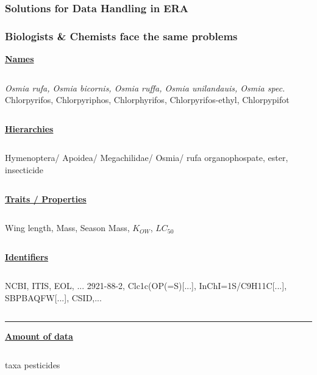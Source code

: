 \documentclass[
	10pt
	]{beamer}
\begin{document}
\begin{frame}[noframenumbering]
\frametitle{Solutions for Data Handling in ERA}
 \resizebox{11.5cm}{!}{%
				
				}
\end{frame}

{
\begin{frame}
\frametitle{Biologists \& Chemists face the same problems}
	\small
	\centering
	\pause
	\textbf{\alert{\underline{Names}}}
	\begin{columns}[t]
	\emph{Osmia rufa, Osmia bicornis, Osmia ruffa, Osmia unilandauis, Osmia spec.} 
	Chlorpyrifos, Chlorpyriphos, Chlorphyrifos, Chlorpyrifos-ethyl, Chlorpypifot
	\end{columns}
	\pause

	\centering
	\textbf{\alert{\underline{Hierarchies}}}
	\begin{columns}[t]
	Hymenoptera/ Apoidea/ Megachilidae/ Osmia/ rufa 
	organophospate, ester, insecticide
	\end{columns}
	\pause

	\centering
	\textbf{\alert{\underline{Traits / Properties}}}
	\begin{columns}[t]
	Wing length, Mass, Season 
	Mass, $K_{OW}$, $LC_{50}$
	\end{columns}
	\pause

	\centering
	\textbf{\alert{\underline{Identifiers}}}
	\begin{columns}[t]
	NCBI, ITIS, EOL, ... 
	2921-88-2, Clc1c(OP(=S)[...], InChI=1S/C9H11C[...], SBPBAQFW[...], CSID,...
	\end{columns}
	\vspace{0.8em}
	\pause

	\rule{\textwidth}{1pt}
	\textbf{\alert{\underline{Amount of data}}}

	\begin{columns}[t]
	 taxa
	 pesticides
	\end{columns}
\end{frame}
}
\end{document}
